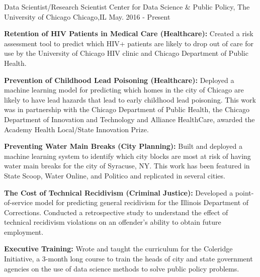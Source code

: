 


\begin{cventries}


  \cventry
    {Data Scientist/Research Scientist} %
    {Center for Data Science \& Public Policy, The University of Chicago} %
    {Chicago,IL} %
    {May. 2016 - Present} %
    {\begin{cvitems}
        \setlength\itemsep{.15em}
        \item { \textbf{Retention of HIV Patients in Medical Care (Healthcare): }Created a risk assessment tool to predict which HIV+ patients are likely to drop out of care for use by the University of Chicago HIV clinic and Chicago Department of Public Health.}
        \item { \textbf{Prevention of Childhood Lead Poisoning (Healthcare): }Deployed a machine learning model for predicting which homes in the city of Chicago are likely to have lead hazards that lead to early childhood lead poisoning. This work was in  partnership with the Chicago Department of Public Health, the Chicago Department of Innovation and Technology and Alliance HealthCare, awarded the Academy Health Local/State Innovation Prize.}
         \item { \textbf{Preventing Water Main Breaks (City Planning): }Built and deployed a machine learning system to identify which city blocks are most at risk of having water main breaks for the city of Syracuse, NY. This work has been featured in State Scoop, Water Online, and Politico and replicated in several cities.}
         \item { \textbf{The Cost of Technical Recidivism (Criminal Justice): }Developed a point-of-service model for predicting general recidivism for the Illinois Department of Corrections. Conducted a retrospective study to understand the effect of technical recidivism violations on an offender's ability to obtain future employment.}
         \item{ \textbf{Executive Training: }Wrote and taught the curriculum for the Coleridge Initiative, a 3-month long course to train the heads of city and state government agencies on the use of data science methods to solve public policy problems.}
     \end{cvitems}}




\end{cventries}
